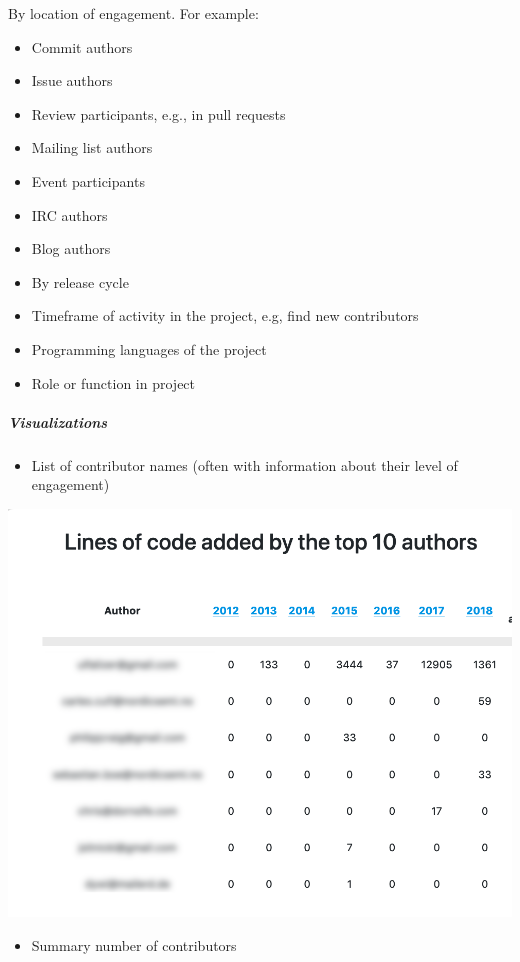 By location of engagement. For example:

\begin{itemize}
\tightlist
\item
  Commit authors
\item
  Issue authors
\item
  Review participants, e.g., in pull requests
\item
  Mailing list authors
\item
  Event participants
\item
  IRC authors
\item
  Blog authors
\item
  By release cycle
\item
  Timeframe of activity in the project, e.g, find new contributors
\item
  Programming languages of the project
\item
  Role or function in project
\end{itemize}

\hypertarget{visualizations}{%
\subparagraph{Visualizations}\label{visualizations}}

\begin{itemize}
\tightlist
\item
  List of contributor names (often with information about their level of
  engagement)
\end{itemize}

\includegraphics{images/contributors_top-contributor-info.png}

\begin{itemize}
\tightlist
\item
  Summary number of contributors
\end{itemize}


